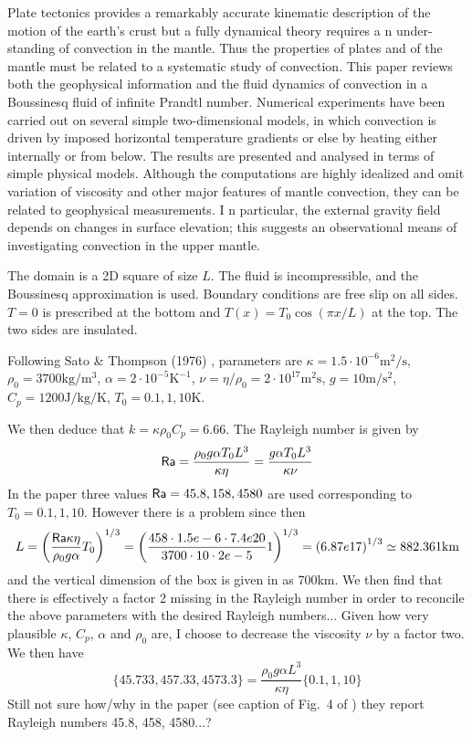 \begin{center}
\begin{minipage}{13cm}
{\small 
Plate tectonics provides a remarkably accurate kinematic description of the
motion of the earth’s crust but a fully dynamical theory requires a n under-
standing of convection in the mantle. Thus the properties of plates and of the
mantle must be related to a systematic study of convection. This paper reviews
both the geophysical information and the fluid dynamics of convection in a
Boussinesq fluid of infinite Prandtl number. Numerical experiments have been
carried out on several simple two-dimensional models, in which convection is
driven by imposed horizontal temperature gradients or else by heating either
internally or from below. The results are presented and analysed in terms of
simple physical models. Although the computations are highly idealized and
omit variation of viscosity and other major features of mantle convection, they
can be related to geophysical measurements. I n particular, the external gravity
field depends on changes in surface elevation; this suggests an observational
means of investigating convection in the upper mantle.}
\end{minipage}
\end{center}

The domain is a 2D square of size $L$. The fluid is incompressible, and the Boussinesq 
approximation is used. Boundary conditions are free slip on all sides. $T=0$ is prescribed 
at the bottom and $T(x)=T_0 \cos (\pi x/L)$ at the top. The two sides are insulated.

Following Sato \& Thompson (1976) \cite{sath76}, 
parameters are $\kappa=1.5\cdot 10^{-6}\si{\square\m\per\second}$, 
$\rho_0=3700\si{\kg\per\cubic\metre}$, $\alpha=2\cdot 10^{-5}\si{\kelvin}^{-1}$, 
$\nu=\eta/\rho_0=2\cdot10^{17} \si{\square\metre\second}$, $g=10\si{\metre\per\square\second}$, 
$C_p=1200 \si{\joule\per\kg\per\kelvin}$, $T_0=0.1,1,10\si{\kelvin}$.  

We then deduce that $k=\kappa \rho_0 C_p = 6.66$. The Rayleigh number is given by
\[
{\mathsf{Ra}} 
= \frac{ \rho_0 g \alpha T_0 L^3  }{\kappa \eta}
= \frac{  g \alpha T_0 L^3  }{\kappa \nu}
\]
In the paper three values ${\mathsf{Ra}}=45.8,158,4580$ are used  corresponding to $T_0=0.1,1,10$. 
However there is a problem since then 
\[
L = \left( \frac{{\mathsf{Ra}} \kappa \eta}{\rho_0 g \alpha } T_0   \right)^{1/3}
= \left( \frac{458\cdot 1.5e-6\cdot 7.4e20}{3700\cdot 10\cdot 2e-5 } 1   \right)^{1/3}
= \left( 6.87e17 \right)^{1/3}
\simeq 882.361 \si{\kilo\metre}
\]
and the vertical dimension of the box is given in \cite{mcrw74} as 700\si{\km}. 
We then find that there is effectively a factor 2 missing in the Rayleigh number in order
to reconcile the above parameters with the desired Rayleigh numbers... 
Given how very plausible $\kappa$, $C_p$, $\alpha$ and $\rho_0$ are, I choose to 
decrease the viscosity $\nu$ by a factor two.
We then have 
\[
\{ 45.733, 457.33, 4573.3 \} = \frac{ \rho_0 g \alpha  L^3  }{\kappa \eta} \{ 0.1, 1, 10\}
\]
Still not sure how/why in the paper (see caption of Fig.~4 of \cite{mcrw74}) 
they report Rayleigh numbers 45.8, 458, 4580...?

